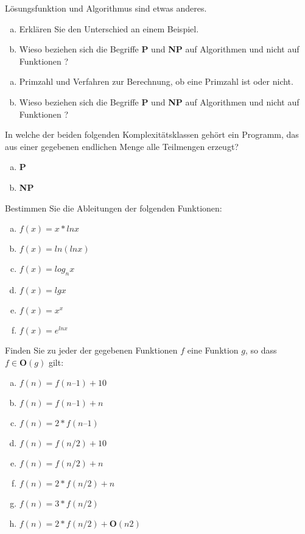 \begin{card}
	Lösungsfunktion und Algorithmus sind etwas anderes.
	\begin{enumerate}[a)]
	\item Erklären Sie den Unterschied an einem Beispiel.
	\item Wieso beziehen sich die Begriffe	\textbf{P} und \textbf{NP} auf Algorithmen und nicht auf Funktionen ? 
	\end{enumerate}
	\hr
	\begin{enumerate}[a)]
	\item Primzahl und Verfahren zur Berechnung, ob eine Primzahl ist oder nicht.
	\item Wieso beziehen sich die Begriffe	\textbf{P} und \textbf{NP} auf Algorithmen und nicht auf Funktionen ? 
	\end{enumerate}
	\hr
\end{card}

\begin{card}
	In welche der beiden folgenden Komplexitätsklassen gehört ein Programm, das aus einer
	gegebenen endlichen Menge alle Teilmengen erzeugt?
	\begin{enumerate}[a)]
	\item \textbf{P}
	\item \textbf{NP}
	\end{enumerate}
	\hr
\end{card}

\begin{card}
	Bestimmen Sie die Ableitungen der folgenden Funktionen:
	\begin{enumerate}[a)]
	\item $f(x) = x * ln x$
	\item $f(x) = ln ( ln x)$
	\item $f(x) = log_n x$
	\item $f(x) = lg x$
	\item $f(x) = x^x$
	\item $f(x) = e^{ln x}$
	\end{enumerate}
	\hr
\end{card}

\begin{card}
	Finden Sie zu jeder der gegebenen Funktionen $f$ eine Funktion $g$, so dass $f \in \mathbf{O}(g)$ gilt: 
	\begin{enumerate}[a)]
	\item $f(n) =f(n – 1 ) + 10 $
	\item $f(n) =f(n– 1 ) +n$
	\item $f(n) = 2*f(n– 1 )$
	\item $f(n) =f(n/ 2 ) + 10$
	\item $f(n) =f(n/ 2 ) +n$
	\item $f(n) = 2*f(n/ 2 ) +n$
	\item $f(n) = 3*f(n/ 2 )$
	\item $f(n) = 2*f(n/ 2 ) + \mathbf{O} (n2)$
	\end{enumerate}
	\hr
\end{card}

